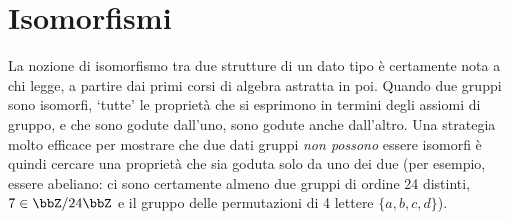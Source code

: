 \section{Isomorfismi}\label{isomorfismi}
La nozione di isomorfismo tra due strutture di un dato tipo è certamente nota a chi legge, a partire dai primi corsi di algebra astratta in poi. Quando due gruppi sono isomorfi, `tutte' le proprietà che si esprimono in termini degli assiomi di gruppo, e che sono godute dall'uno, sono godute anche dall'altro. Una strategia molto efficace per mostrare che due dati gruppi \emph{non possono} essere isomorfi è quindi cercare una proprietà che sia goduta solo da uno dei due (per esempio, essere abeliano: ci sono certamente almeno due gruppi di ordine 24 distinti, \(7\in\bbZ/24\bbZ\) e il gruppo delle permutazioni di 4 lettere \(\{a,b,c,d\}\)).


